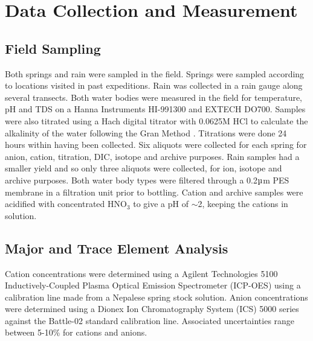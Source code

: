 
\newpage

\section{Data Collection and Measurement}


\subsection{Field Sampling}
Both springs and rain were sampled in the field. Springs were sampled according to locations visited in past expeditions. Rain was collected in a rain gauge along several transects. Both water bodies were measured in the field for temperature, pH and TDS on a Hanna Instruments HI-991300 and EXTECH DO700. Samples were also titrated using a Hach digital titrator with 0.0625M HCl to calculate the alkalinity of the water following the Gran Method \parencite{gran1952}. Titrations were done 24 hours within having been collected. Six aliquots were collected for each spring for anion, cation, titration, DIC, isotope and archive purposes. Rain samples had a smaller yield and so only three aliquots were collected, for ion, isotope and archive purposes. Both water body types were filtered through a 0.2$\micro$m PES membrane in a filtration unit prior to bottling. Cation and archive samples were acidified with concentrated HNO$_3$ to give a pH of $\sim$2, keeping the cations in solution. 


\subsection{Major and Trace Element Analysis}

Cation concentrations were determined using a Agilent Technologies 5100 Inductively-Coupled Plasma Optical Emission Spectrometer (ICP-OES) using a calibration line made from a Nepalese spring stock solution. Anion concentrations were determined using a Dionex Ion Chromatography System (ICS) 5000 series against the Battle-02 standard calibration line. Associated uncertainties range between 5-10\% for cations and anions.



